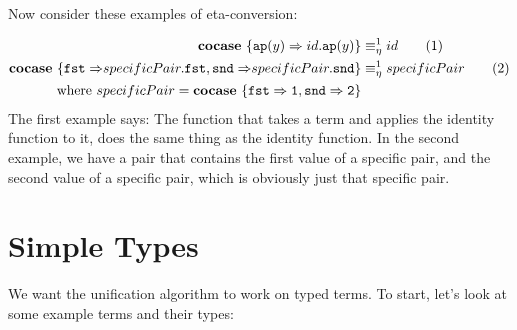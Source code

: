 \documentclass[twoside,12pt,a4paper]{article}
\begin{document}
Now consider these examples of eta-conversion:
\begin{example}
    \begin{align*}
        \textbf{cocase}\ \{\texttt{ap}(y)\Rightarrow id.\texttt{ap}(y)\}&\equiv_{\eta}^1 id\tag{1}\\
        \textbf{cocase}\ \{\mathtt{fst\Rightarrow} specificPair.\mathtt{fst}, \mathtt{snd\Rightarrow}specificPair.\mathtt{snd}\}&\equiv_{\eta}^1 specificPair \tag{2}\\      
        \text{where } specificPair = \textbf{cocase}\ \{\mathtt{fst\Rightarrow 1, snd\Rightarrow 2}\}
    \end{align*} %
    The first example says: The function that takes a term and applies the identity function to it, does the same thing as the identity function.
    In the second example, we have a pair that contains the first value of a specific pair, and the second value of a specific pair, which is obviously just that specific pair.    
\end{example}    
    
\section{Simple Types}\label{sec:Simple Types}

We want the unification algorithm to work on typed terms. 
To start, let's look at some example terms and their types:
\end{document}
